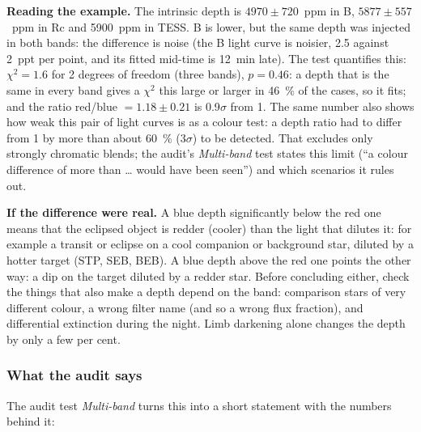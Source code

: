 \textbf{Reading the example.} The intrinsic depth is $4970 \pm 720$~ppm in
B, $5877 \pm 557$~ppm in Rc and 5900~ppm in TESS. B is lower, but the same
depth was injected in both bands: the difference is noise (the B light
curve is noisier, 2.5 against 2~ppt per point, and its fitted mid-time is
12~min late). The test quantifies this: $\chi^2 = 1.6$ for 2 degrees of
freedom (three bands), $p = 0.46$: a depth that is the same in every band
gives a $\chi^2$ this large or larger in 46~\% of the cases, so it fits; and the ratio
red/blue $= 1.18 \pm 0.21$ is 0.9$\sigma$ from 1. The same number also
shows how weak this pair of light curves is as a colour test: a depth ratio
had to differ from 1 by more than about 60~\% (3$\sigma$) to be detected.
That excludes only strongly chromatic blends; the audit's \emph{Multi-band}
test states this limit (``a colour difference of more than \ldots{} would
have been seen'') and which scenarios it rules out.

\textbf{If the difference were real.} A blue depth significantly below the
red one means that the eclipsed object is redder (cooler) than the light
that dilutes it: for example a transit or eclipse on a cool companion or
background star, diluted by a hotter target (STP, SEB, BEB). A blue depth
above the red one points the other way: a dip on the target diluted by a
redder star. Before concluding either, check the things that also make a
depth depend on the band: comparison stars of very different colour, a
wrong filter name (and so a wrong flux fraction), and differential
extinction during the night. Limb darkening alone changes the depth by only
a few per cent.


\subsubsection*{What the audit says}

The audit test \emph{Multi-band} turns this into a short statement with
the numbers behind it:

